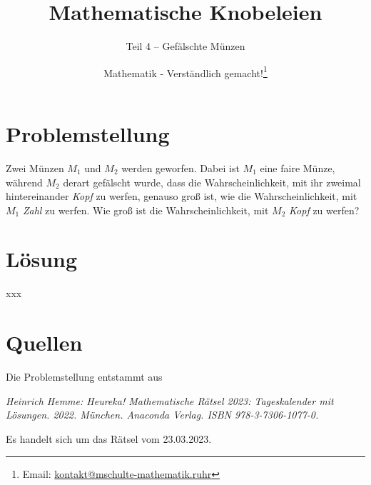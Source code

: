 \documentclass[ngerman]{scrartcl}
\title{Mathematische Knobeleien}
\subtitle{Teil 4 -- Gefälschte Münzen}
\author{Mathematik - Verständlich gemacht!\footnote{Email: \href{mailto:kontakt@mschulte-mathematik.ruhr}{kontakt@mschulte-mathematik.ruhr}}}
\begin{document}
\maketitle

\section*{Problemstellung}
Zwei Münzen $M_1$ und $M_2$ werden geworfen. Dabei ist $M_1$ eine
faire Münze, während $M_2$ derart gefälscht wurde, dass die 
Wahrscheinlichkeit, mit ihr zweimal hintereinander \textit{Kopf} zu 
werfen, genauso groß ist, wie die Wahrscheinlichkeit, mit $M_1$ 
\textit{Zahl} zu werfen. Wie groß ist die Wahrscheinlichkeit, mit 
$M_2$ \textit{Kopf} zu werfen?

\section*{Lösung}
xxx

\section*{Quellen}
Die Problemstellung entstammt aus

\centering
\textit{Heinrich Hemme: Heureka! Mathematische Rätsel 2023: Tageskalender mit Lösungen.
	2022. München. Anaconda Verlag. ISBN 978-3-7306-1077-0.}

\raggedright
Es handelt sich um das Rätsel vom 23.03.2023.
\end{document}
